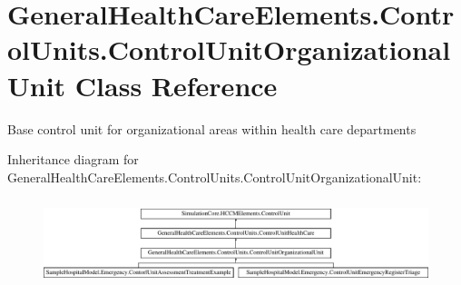\hypertarget{class_general_health_care_elements_1_1_control_units_1_1_control_unit_organizational_unit}{}\section{General\+Health\+Care\+Elements.\+Control\+Units.\+Control\+Unit\+Organizational\+Unit Class Reference}
\label{class_general_health_care_elements_1_1_control_units_1_1_control_unit_organizational_unit}


Base control unit for organizational areas within health care departments  


Inheritance diagram for General\+Health\+Care\+Elements.\+Control\+Units.\+Control\+Unit\+Organizational\+Unit\+:\begin{figure}[H]
\begin{center}
\leavevmode
\includegraphics[height=2.528217cm]{class_general_health_care_elements_1_1_control_units_1_1_control_unit_organizational_unit}
\end{center}
\end{figure}
